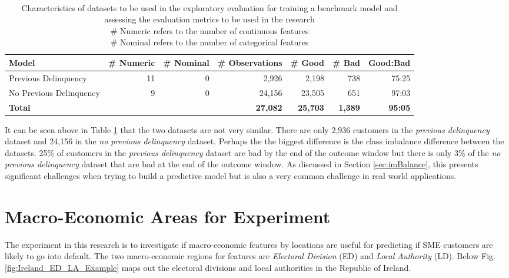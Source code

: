\begin{table}[H]
	\centering\
	\resizebox{\textwidth}{!}
	{
		\begin{tabular}{l r r r r r r}
			\hline
			\textbf{Model} &  \textbf{\# Numeric} & \textbf{\# Nominal} & \textbf{\# Observations} & \textbf{\# Good} & \textbf{\# Bad} & \textbf{Good:Bad}\\
			\hline
			Previous Delinquency & 11 & 0 & 2,926 & 2,198  & 738 & 75:25 \\ 
			No Previous Delinquency & 9 & 0 & 24,156 & 23,505 & 651  & 97:03 \\ \hline
			\textbf{Total} &  &  & \textbf{27,082} & \textbf{25,703} & \textbf{1,389} & \textbf{95:05} \\ \hline
		\end{tabular}
	}
	\caption{Characteristics of datasets to be used in the exploratory evaluation for training a benchmark model and assessing the evaluation metrics to be used in the research \\
		 \# Numeric refers to the number of continuous features \\
		 \# Nominal refers to the number of categorical features
		}
	\label{characteristicsDatasets}
\end{table}

It can be seen above in Table \ref{characteristicsDatasets} that the two datasets are not very similar. There are only 2,936 customers in the \textit{previous delinquency} dataset and 24,156 in the \textit{no previous delinquency} dataset. Perhaps the the biggest difference is the class imbalance difference between the datasets. 25\% of customers in the \textit{previous delinquency} dataset are bad by the end of the outcome window but there is only 3\% of the \textit{no previous delinquency} dataset that are bad at the end of the outcome window. As discussed in Section \ref{sec:imBalance}, this presents significant challenges when trying to build a predictive model but is also a very common challenge in real world applications. 


\section{Macro-Economic Areas for Experiment}
The experiment in this research is to investigate if macro-economic features by locations are useful for predicting if SME customers are likely to go into default. The two macro-economic regions for features are \textit{Electoral Division} (ED) and \textit{Local Authority} (LD). Below Fig. \ref{fig:Ireland_ED_LA_Example} maps out the electoral divisions and local authorities in the Republic of Ireland.


